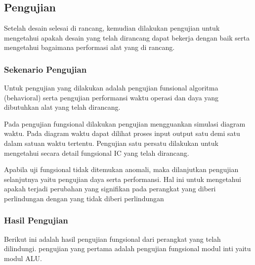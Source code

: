 % 

\chapter{\babEmpat}

% 

\section{Pengujian}
Setelah desain selesai di rancang, kemudian dilakukan pengujian untuk mengetahui apakah desain yang telah dirancang dapat bekerja dengan baik serta mengetahui bagaimana performasi alat yang di rancang.

\subsection{Sekenario Pengujian}
Untuk pengujian yang dilakukan adalah pengujian funsional algoritma (behavioral) serta pengujian performansi waktu operasi dan daya yang dibutuhkan alat yang telah dirancang.

Pada pengujian fungsional dilakukan pengujian mengguankan simulasi diagram waktu. Pada diagram waktu dapat dilihat proses input output satu demi satu dalam satuan waktu tertentu. Pengujian satu persatu dilakukan untuk mengetahui secara detail fungsional IC yang telah dirancang.

Apabila uji fungsional tidak ditemukan anomali, maka dilanjutkan pengujian selanjutnya yaitu pengujian daya serta performansi. Hal ini untuk mengetahui apakah terjadi perubahan yang signifikan pada perangkat yang diberi perlindungan dengan yang tidak diberi perlindungan

\subsection{Hasil Pengujian}
Berikut ini adalah hasil pengujian fungsional dari perangkat yang telah dilindungi. pengujian yang pertama adalah pengujian fungsional  modul inti yaitu modul ALU.

